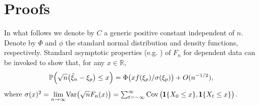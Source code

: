 \documentclass[a4paper, 12pt]{article}
\theoremstyle{plain}
\theoremstyle{definition}
\newcommand{\prob}{{\Bbb P}}
\begin{document}
\section{Proofs}
\label{sec:proofs}
In what follows we denote by $C$ a generic positive constant independent of $n$.
Denote by $\Phi$ and $\phi$ the standard normal distribution and density functions, respectively.
Standard asymptotic properties (e.g. \citet{LahiriSun:2009}) of $F_n$ for dependent data can be invoked to show that, for any $x\in\mathbb{R}$,
\begin{equation}
\prob\Big(\sqrt{n}\big(\hat\xi_n-\xi_p\big)\le x\Big)=
\Phi\big(xf(\xi_p)/\sigma(\xi_p)\big)+O(n^{-1/2}),
\label{pf:true}
\end{equation}
where $\sigma(x)^2=\underset{n\rightarrow\infty}\lim\text{Var}\big(\sqrt{n}F_n(x)\big)
=\sum_{t=-\infty}^\infty\mbox{\rm Cov}\,\big(\pmb{1}\{X_0\le x\},\pmb{1}\{X_t\le x\}\big)$.
\end{document}
